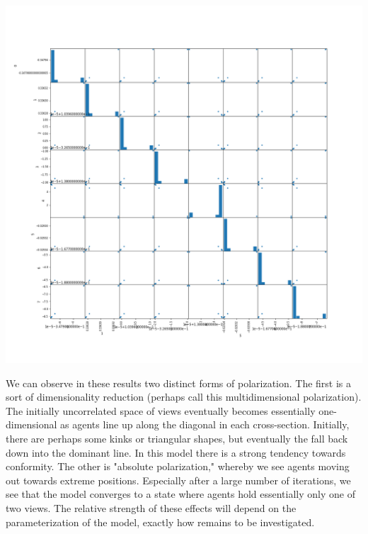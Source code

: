 \documentclass{article}
\begin{document}
\begin{center}
\includegraphics[width=\linewidth]{200_10_0_8_130.png}

\end{center}

We can observe in these results two distinct forms of polarization. The first is a sort of dimensionality reduction (perhaps call this multidimensional polarization). The initially uncorrelated space of views eventually becomes essentially one-dimensional as agents line up along the diagonal in each cross-section. Initially, there are perhaps some kinks or triangular shapes, but eventually the fall back down into the dominant line. In this model there is a strong tendency towards conformity. The other is "absolute polarization," whereby we see agents moving out towards extreme positions. Especially after a large number of iterations, we see that the model converges to a state where agents hold essentially only one of two views. The relative strength of these effects will depend on the parameterization of the model, exactly how remains to be investigated.
\end{document}
